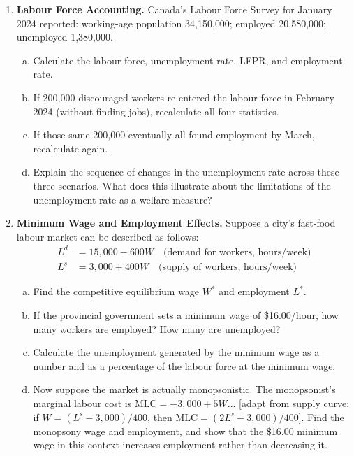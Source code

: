\begin{enumerate}

\item \textbf{Labour Force Accounting.}
Canada's Labour Force Survey for January 2024 reported: working-age
population 34{,}150{,}000; employed 20{,}580{,}000; unemployed 1{,}380{,}000.
\begin{enumerate}[(a)]
  \item Calculate the labour force, unemployment rate, LFPR, and
        employment rate.
  \item If 200{,}000 discouraged workers re-entered the labour force
        in February 2024 (without finding jobs), recalculate all four
        statistics.
  \item If those same 200{,}000 eventually all found employment by March,
        recalculate again.
  \item Explain the sequence of changes in the unemployment rate across
        these three scenarios. What does this illustrate about the
        limitations of the unemployment rate as a welfare measure?
\end{enumerate}

\item \textbf{Minimum Wage and Employment Effects.}
Suppose a city's fast-food labour market can be described as follows:
\begin{align*}
  L^d &= 15{,}000 - 600W \quad \text{(demand for workers, hours/week)}\\
  L^s &= 3{,}000 + 400W \quad \text{(supply of workers, hours/week)}
\end{align*}
\begin{enumerate}[(a)]
  \item Find the competitive equilibrium wage $W^*$ and employment $L^*$.
  \item If the provincial government sets a minimum wage of \$16.00/hour,
        how many workers are employed? How many are unemployed?
  \item Calculate the unemployment generated by the minimum wage as a
        number and as a percentage of the labour force at the minimum wage.
  \item Now suppose the market is actually monopsonistic. The monopsonist's
        marginal labour cost is $\text{MLC} = -3{,}000 + 5W$... [adapt
        from supply curve: if $W = (L^s - 3{,}000)/400$, then
        $\text{MLC} = (2L^s - 3{,}000)/400$]. Find the monopsony wage
        and employment, and show that the \$16.00 minimum wage in this
        context increases employment rather than decreasing it.
\end{enumerate}


\end{enumerate}

